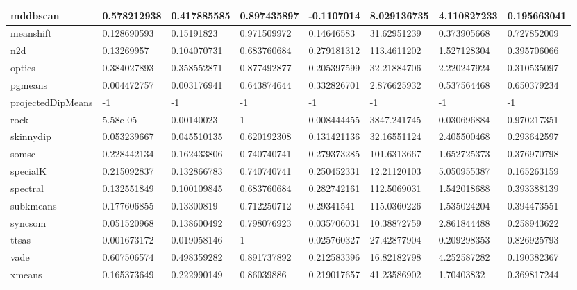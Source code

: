 \begin{table}[H]
\begin{tabular}{|l|l|l|l|l|l|l|l|}
\hline
mddbscan & 0.578212938 & 0.417885585 & 0.897435897 & -0.1107014 & 8.029136735 & 4.110827233 & 0.195663041 \\
\hline
meanshift & 0.128690593 & 0.15191823 & 0.971509972 & 0.14646583 & 31.62951239 & 0.373905668 & 0.727852009 \\
\hline
n2d & 0.13269957 & 0.104070731 & 0.683760684 & 0.279181312 & 113.4611202 & 1.527128304 & 0.395706066 \\
\hline
optics & 0.384027893 & 0.358552871 & 0.877492877 & 0.205397599 & 32.21884706 & 2.220247924 & 0.310535097 \\
\hline
pgmeans & 0.004472757 & 0.003176941 & 0.643874644 & 0.332826701 & 2.876625932 & 0.537564468 & 0.650379234 \\
\hline
projectedDipMeans & -1 & -1 & -1 & -1 & -1 & -1 & -1 \\
\hline
rock & 5.58e-05 & 0.00140023 & 1 & 0.008444455 & 3847.241745 & 0.030696884 & 0.970217351 \\
\hline
skinnydip & 0.053239667 & 0.045510135 & 0.620192308 & 0.131421136 & 32.16551124 & 2.405500468 & 0.293642597 \\
\hline
somsc & 0.228442134 & 0.162433806 & 0.740740741 & 0.279373285 & 101.6313667 & 1.652725373 & 0.376970798 \\
\hline
specialK & 0.215092837 & 0.132866783 & 0.740740741 & 0.250452331 & 12.21120103 & 5.050955387 & 0.165263159 \\
\hline
spectral & 0.132551849 & 0.100109845 & 0.683760684 & 0.282742161 & 112.5069031 & 1.542018688 & 0.393388139 \\
\hline
subkmeans & 0.177606855 & 0.13300819 & 0.712250712 & 0.29341541 & 115.0360226 & 1.535024204 & 0.394473551 \\
\hline
syncsom & 0.051520968 & 0.138600492 & 0.798076923 & 0.035706031 & 10.38872759 & 2.861844488 & 0.258943622 \\
\hline
ttsas & 0.001673172 & 0.019058146 & 1 & 0.025760327 & 27.42877904 & 0.209298353 & 0.826925793 \\
\hline
vade & 0.607506574 & 0.498359282 & 0.891737892 & 0.212583396 & 16.82182798 & 4.252587282 & 0.190382367 \\
\hline
xmeans & 0.165373649 & 0.222990149 & 0.86039886 & 0.219017657 & 41.23586902 & 1.70403832 & 0.369817244 \\
\hline
\end{tabular}
\end{table}

\clearpage

